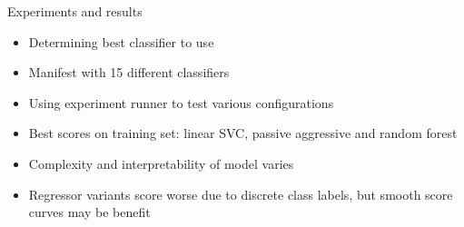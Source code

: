 \documentclass[t,11pt]{beamer}
\begin{document}
\begin{frame}[fragile]{Experiments and results}
\begin{itemize}
  \item Determining best classifier to use
  \item Manifest with 15 different classifiers
  \item Using experiment runner to test various configurations
  \item Best scores on training set: linear SVC, passive aggressive and random 
    forest
  \item Complexity and interpretability of model varies
  \item Regressor variants score worse due to discrete class labels, but smooth 
    score curves may be benefit
\end{itemize}
\end{frame}
\end{document}
